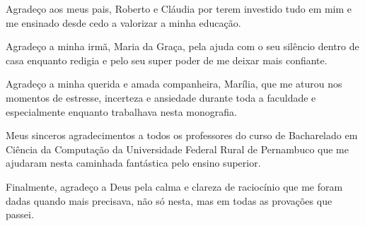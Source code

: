 Agradeço aos meus pais, Roberto e Cláudia por terem investido tudo em mim e me 
ensinado desde cedo a valorizar a minha educação.

Agradeço a minha irmã, Maria da Graça, pela ajuda com o seu silêncio dentro de 
casa enquanto redigia e pelo seu super poder de me deixar mais confiante.

Agradeço a minha querida e amada companheira, Marília, que me aturou nos 
momentos de estresse, incerteza e ansiedade durante toda a faculdade e 
especialmente enquanto trabalhava nesta monografia.

Meus sinceros agradecimentos a todos os professores do curso de Bacharelado em 
Ciência da Computação da Universidade Federal Rural de Pernambuco que me ajudaram 
nesta caminhada fantástica pelo ensino superior.

Finalmente, agradeço a Deus pela calma e clareza de raciocínio que me foram 
dadas quando mais precisava, não só nesta, mas em todas as provações que passei.